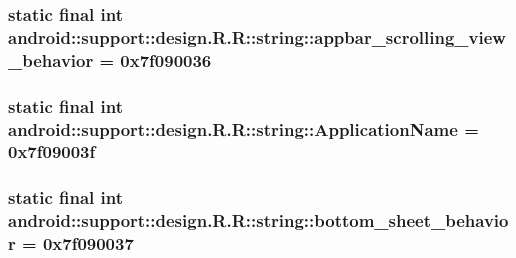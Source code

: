 \hypertarget{classandroid_1_1support_1_1design_1_1_r_1_1string_9413fca061b407a0bfabca5e6a8ab12a}{
\subsubsection[{appbar\_\-scrolling\_\-view\_\-behavior}]{\setlength{\rightskip}{0pt plus 5cm}static final int android::support::design.R.R::string::appbar\_\-scrolling\_\-view\_\-behavior = 0x7f090036}}
\label{classandroid_1_1support_1_1design_1_1_r_1_1string_9413fca061b407a0bfabca5e6a8ab12a}


\hypertarget{classandroid_1_1support_1_1design_1_1_r_1_1string_1b36e68c1f8b75bc309ec67fd707c9da}{
\subsubsection[{ApplicationName}]{\setlength{\rightskip}{0pt plus 5cm}static final int android::support::design.R.R::string::ApplicationName = 0x7f09003f}}
\label{classandroid_1_1support_1_1design_1_1_r_1_1string_1b36e68c1f8b75bc309ec67fd707c9da}


\hypertarget{classandroid_1_1support_1_1design_1_1_r_1_1string_c71064a88f54f0a001b6e30cee8a2f31}{
\subsubsection[{bottom\_\-sheet\_\-behavior}]{\setlength{\rightskip}{0pt plus 5cm}static final int android::support::design.R.R::string::bottom\_\-sheet\_\-behavior = 0x7f090037}}
\label{classandroid_1_1support_1_1design_1_1_r_1_1string_c71064a88f54f0a001b6e30cee8a2f31}


